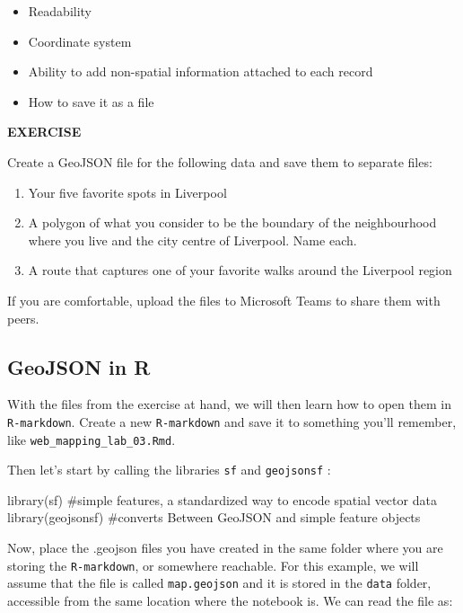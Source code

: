 \documentclass[
  letterpaper,
  DIV=11,
  numbers=noendperiod]{scrreprt}
\newenvironment{Shaded}{\begin{snugshade}}{\end{snugshade}}
\newcommand{\CommentTok}[1]{\textcolor[rgb]{0.37,0.37,0.37}{#1}}
\newcommand{\FunctionTok}[1]{\textcolor[rgb]{0.28,0.35,0.67}{#1}}
\newcommand{\NormalTok}[1]{\textcolor[rgb]{0.00,0.23,0.31}{#1}}
\providecommand{\tightlist}{%
  \setlength{\itemsep}{0pt}\setlength{\parskip}{0pt}}\usepackage{longtable,booktabs,array}
\begin{document}
\begin{itemize}
\tightlist
\item
  Readability
\item
  Coordinate system
\item
  Ability to add non-spatial information attached to each record
\item
  How to save it as a file
\end{itemize}

\textbf{EXERCISE}

Create a GeoJSON file for the following data and save them to separate
files:

\begin{enumerate}
\def\labelenumi{\arabic{enumi}.}
\item
  Your five favorite spots in Liverpool
\item
  A polygon of what you consider to be the boundary of the neighbourhood
  where you live and the city centre of Liverpool. Name each.
\item
  A route that captures one of your favorite walks around the Liverpool
  region
\end{enumerate}

If you are comfortable, upload the files to Microsoft Teams to share
them with peers.

\hypertarget{geojson-in-r}{%
\subsection{GeoJSON in R}\label{geojson-in-r}}

With the files from the exercise at hand, we will then learn how to open
them in \texttt{R-markdown}. Create a new \texttt{R-markdown} and save
it to something you'll remember, like
\texttt{web\_mapping\_lab\_03.Rmd}.

Then let's start by calling the libraries \texttt{sf} and
\texttt{geojsonsf} :

\begin{Shaded}
\begin{Highlighting}[]
\FunctionTok{library}\NormalTok{(sf) }\CommentTok{\#simple features, a standardized way to encode spatial vector data}
\FunctionTok{library}\NormalTok{(geojsonsf) }\CommentTok{\#converts Between GeoJSON and simple feature objects}
\end{Highlighting}
\end{Shaded}

Now, place the .geojson files you have created in the same folder where
you are storing the \texttt{R-markdown}, or somewhere reachable. For
this example, we will assume that the file is called
\texttt{map.geojson} and it is stored in the \texttt{data} folder,
accessible from the same location where the notebook is. We can read the
file as:
\end{document}
